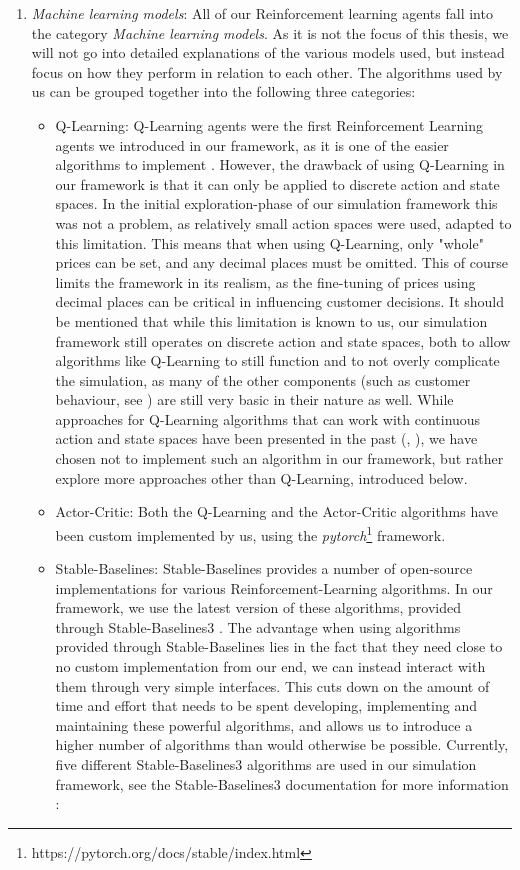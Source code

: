 \begin{enumerate}
	\item \emph{Machine learning models}: All of our Reinforcement learning agents fall into the category \emph{Machine learning models}. As it is not the focus of this thesis, we will not go into detailed explanations of the various models used, but instead focus on how they perform in relation to each other. The algorithms used by us can be grouped together into the following three categories:
	      \begin{itemize}
		      \item Q-Learning: Q-Learning agents were the first Reinforcement Learning agents we introduced in our framework, as it is one of the easier algorithms to implement \cite{reinforcementLearningOverview}. However, the drawback of using Q-Learning in our framework is that it can only be applied to discrete action and state spaces. In the initial exploration-phase of our simulation framework this was not a problem, as relatively small action spaces were used, adapted to this limitation. This means that when using Q-Learning, only "whole" prices can be set, and any decimal places must be omitted. This of course limits the framework in its realism, as the fine-tuning of prices using decimal places can be critical in influencing customer decisions. It should be mentioned that while this limitation is known to us, our simulation framework still operates on discrete action and state spaces, both to allow algorithms like Q-Learning to still function and to not overly complicate the simulation, as many of the other components (such as customer behaviour, see ) are still very basic in their nature as well. While approaches for Q-Learning algorithms that can work with continuous action and state spaces have been presented in the past (\cite{QLearningContinuous}, \cite{QLearningContinuous2}), we have chosen not to implement such an algorithm in our framework, but rather explore more approaches other than Q-Learning, introduced below.
		      \item Actor-Critic: Both the Q-Learning and the Actor-Critic algorithms have been custom implemented by us, using the \emph{pytorch}\footnote[0][-0.2]{https://pytorch.org/docs/stable/index.html} framework.
		      \item Stable-Baselines: Stable-Baselines provides a number of open-source implementations for various Reinforcement-Learning algorithms. In our framework, we use the latest version of these algorithms, provided through Stable-Baselines3 \cite{StableBaselines3}. The advantage when using algorithms provided through Stable-Baselines lies in the fact that they need close to no custom implementation from our end, we can instead interact with them through very simple interfaces. This cuts down on the amount of time and effort that needs to be spent developing, implementing and maintaining these powerful algorithms, and allows us to introduce a higher number of algorithms than would otherwise be possible. Currently, five different Stable-Baselines3 algorithms are used in our simulation framework, see the Stable-Baselines3 documentation for more information \cite{StableBaselines3Algorithms}:

\end{itemize}
\end{enumerate}
